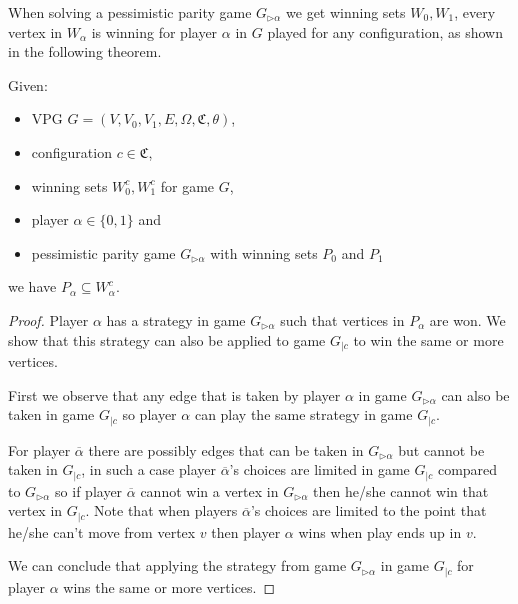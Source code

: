 When solving a pessimistic parity game $G_{\triangleright\alpha}$ we get winning sets $W_0,W_1$, every vertex in $W_\alpha$ is winning for player $\alpha$ in $G$ played for any configuration, as shown in the following theorem.
\begin{theorem}
	\label{the_pess_is_winning_for_all_conf}
	Given:
	\begin{itemize}
		\item VPG $G = (V,V_0,V_1,E,\Omega,\mathfrak{C},\theta)$,
		\item configuration $c \in \mathfrak{C}$,
		\item winning sets $W_0^c, W_1^c$ for game $G$,
		\item player $\alpha \in \{0,1\}$ and
		\item pessimistic parity game $G_{\triangleright\alpha}$ with winning sets $P_0$ and $P_1$
	\end{itemize}
	we have $P_\alpha \subseteq W_\alpha^c$.
	\begin{proof}
		Player $\alpha$ has a strategy in game $G_{\triangleright\alpha}$ such that vertices in $P_\alpha$ are won. We show that this strategy can also be applied to game $G_{|c}$ to win the same or more vertices.
		
		First we observe that any edge that is taken by player $\alpha$ in game $G_{\triangleright\alpha}$ can also be taken in game $G_{|c}$ so player $\alpha$ can play the same strategy in game $G_{|c}$.
		
		For player $\overline{\alpha}$ there are possibly edges that can be taken in $G_{\triangleright\alpha}$ but cannot be taken in $G_{|c}$, in such a case player $\overline{\alpha}$'s choices are limited in game $G_{|c}$ compared to $G_{\triangleright\alpha}$ so if player $\overline{\alpha}$ cannot win a vertex in $G_{\triangleright\alpha}$ then he/she cannot win that vertex in $G_{|c}$. Note that when players $\overline{\alpha}$'s choices are limited to the point that he/she can't move from vertex $v$ then player $\alpha$ wins when play ends up in $v$.
		
		We can conclude that applying the strategy from game $G_{\triangleright\alpha}$ in game $G_{|c}$ for player $\alpha$ wins the same or more vertices.
	\end{proof}
\end{theorem}

